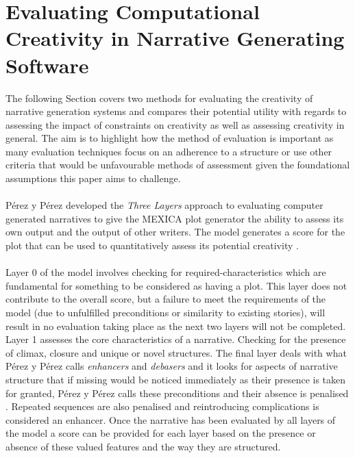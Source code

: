 \documentclass[letterpaper]{article}
\begin{document}
\section{Evaluating Computational Creativity in Narrative Generating Software} \label{sec:eval}
The following Section covers two methods for evaluating the creativity of narrative generation systems and compares their potential utility with regards to assessing the impact of constraints on creativity as well as assessing creativity in general. The aim is to highlight how  the method of evaluation is important as many evaluation techniques focus on an adherence to a structure or use other criteria that would be unfavourable methods of assessment given the foundational assumptions this paper aims to challenge. 
\\
\\P\'erez y P\'erez developed the \emph{Three Layers} approach to evaluating computer generated narratives to give the MEXICA plot generator the ability to assess its own output and the output of other writers. The model generates a score for the plot that can be used to quantitatively assess its potential creativity \cite{y2014three}.\\
\\Layer 0 of the model involves checking for required-characteristics  which are fundamental for something to be considered as having a plot. This layer does not contribute to the overall score, but a failure to meet the requirements of the model (due to unfulfilled preconditions or similarity to existing stories), will result in no evaluation taking place as the next two layers will not be completed. Layer 1 assesses the core characteristics of a narrative. Checking for the presence of climax, closure and unique or novel structures. The final layer deals with what P\'erez y P\'erez calls \emph{enhancers} and \emph{debasers} and it looks for aspects of narrative structure that if missing would be noticed immediately as their presence is taken for granted, P\'erez y P\'erez calls these preconditions and their absence is  penalised \cite{y2014three}. Repeated sequences are also penalised and reintroducing complications is considered an enhancer. Once the narrative has been evaluated by all layers of the model a score can be provided for each layer based on the presence or absence of these valued features and the way they are structured.\\
\end{document}
